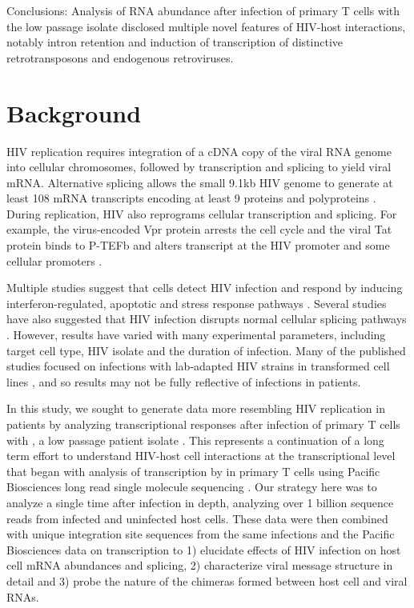 \documentclass[../sherrill-Mix_thesis.tex]{subfiles}
\begin{document}
	Conclusions: Analysis of RNA abundance after infection of primary T cells with the low passage \hivEight{} isolate disclosed multiple novel features of HIV-host interactions, notably intron retention and induction of transcription of distinctive retrotransposons and endogenous retroviruses.

\section{Background}
	HIV replication requires integration of a cDNA copy of the viral RNA genome into cellular chromosomes, followed by transcription and splicing to yield viral mRNA. Alternative splicing allows the small 9.1kb HIV genome to generate at least 108 mRNA transcripts encoding at least 9 proteins and polyproteins  \citep{Wain-Hobson1985,Arya1985,Schwartz1990,Purcell1993,Stoltzfus2009,Ocwieja2012}. During replication, HIV also reprograms cellular transcription and splicing. For example, the virus-encoded Vpr protein arrests the cell cycle \citep{He1995,Jowett1995,Rogel1995,Goh1998} and the viral Tat protein binds to P-TEFb and alters transcript at the HIV promoter and some cellular promoters \citep{Marciniak1991,Wei1998,Kanazawa2000,Barboric2007,OBrien2010,Muniz2010}. 

	Multiple studies suggest that cells detect HIV infection and respond by inducing interferon-regulated, apoptotic and stress response pathways \citep{Corbeil2001,Woelk2004,Hyrcza2007,Wu2008,Smith2010,Chang2011,Imbeault2012,Mohammadi2013,Peng2014}. Several studies have also suggested that HIV infection disrupts normal cellular splicing pathways \citep{Dowling2008,Peng2014}. However, results have varied with many experimental parameters, including target cell type, HIV isolate and the duration of infection. Many of the published studies focused on infections with lab-adapted HIV strains in transformed cell lines \citep{Corbeil2001,Mitchell2003,delaFuente2002,Chang2011,Lefebvre2011,Peng2014}, and so results may not be fully reflective of infections in patients.

	In this study, we sought to generate data more resembling HIV replication in patients by analyzing transcriptional responses after infection of primary T cells with \hivEight{}, a low passage patient isolate \citep{Collman1992}.  This represents a continuation of a long term effort to understand HIV-host cell interactions at the transcriptional level that began with analysis of transcription by \hivEight{} in primary T cells using Pacific Biosciences long read single molecule sequencing \citep{Ocwieja2012}. Our strategy here was to analyze a single time after infection in depth, analyzing over 1 billion sequence reads from \hivEight{} infected and uninfected host cells. These data were then combined with \nIntegrations{} unique integration site sequences from the same infections and the Pacific Biosciences data on \hivEight{} transcription to 1) elucidate effects of HIV infection on host cell mRNA abundances and splicing, 2) characterize viral message structure in detail and 3) probe the nature of the chimeras formed between host cell and viral RNAs.  
\end{document}
